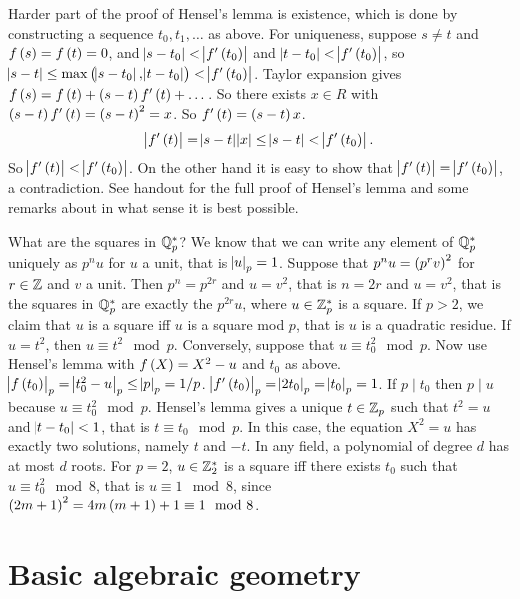 Harder part of the proof of Hensel's lemma is existence, which is done by constructing a sequence $ t_0, t_1, \dots $ as above. For uniqueness, suppose $ s \ne t $ and $ f\br{s} = f\br{t} = 0 $, and $ \abs{s - t_0} < \abs{f'\br{t_0}} $ and $ \abs{t - t_0} < \abs{f'\br{t_0}} $, so $ \abs{s - t} \le \max\br{\abs{s - t_0}, \abs{t - t_0}} < \abs{f'\br{t_0}} $. Taylor expansion gives $ f\br{s} = f\br{t} + \br{s - t}f'\br{t} + \dots $. So there exists $ x \in R $ with $ \br{s - t}f'\br{t} = \br{s - t}^2 = x $. So $ f'\br{t} = \br{s - t}x $.
$$ \abs{f'\br{t}} = \abs{s - t}\abs{x} \le \abs{s - t} < \abs{f'\br{t_0}}. $$
So $ \abs{f'\br{t}} < \abs{f'\br{t_0}} $. On the other hand it is easy to show that $ \abs{f'\br{t}} = \abs{f'\br{t_0}} $, a contradiction. See handout for the full proof of Hensel's lemma and some remarks about in what sense it is best possible.


What are the squares in $ \mathbb{Q}_p^* $? We know that we can write any element of $ \mathbb{Q}_p^* $ uniquely as $ p^nu $ for $ u $ a unit, that is $ \abs{u}_p = 1 $. Suppose that $ p^nu = \br{p^rv}^2 $ for $ r \in \mathbb{Z} $ and $ v $ a unit. Then $ p^n = p^{2r} $ and $ u = v^2 $, that is $ n = 2r $ and $ u = v^2 $, that is the squares in $ \mathbb{Q}_p^* $ are exactly the $ p^{2r}u $, where $ u \in \mathbb{Z}_p^* $ is a square. If $ p > 2 $, we claim that $ u $ is a square iff $ u $ is a square mod $ p $, that is $ u $ is a quadratic residue. If $ u = t^2 $, then $ u \equiv t^2 \mod p $. Conversely, suppose that $ u \equiv t_0^2 \mod p $. Now use Hensel's lemma with $ f\br{X} = X^2 - u $ and $ t_0 $ as above. $ \abs{f\br{t_0}}_p = \abs{t_0^2 - u}_p \le \abs{p}_p = 1 / p $. $ \abs{f'\br{t_0}}_p = \abs{2t_0}_p = \abs{t_0}_p = 1 $. If $ p \mid t_0 $ then $ p \mid u $ because $ u \equiv t_0^2 \mod p $. Hensel's lemma gives a unique $ t \in \mathbb{Z}_p $ such that $ t^2 = u $ and $ \abs{t - t_0} < 1 $, that is $ t \equiv t_0 \mod p $. In this case, the equation $ X^2 = u $ has exactly two solutions, namely $ t $ and $ -t $. In any field, a polynomial of degree $ d $ has at most $ d $ roots. For $ p = 2 $, $ u \in \mathbb{Z}_2^* $ is a square iff there exists $ t_0 $ such that $ u \equiv t_0^2 \mod 8 $, that is $ u \equiv 1 \mod 8 $, since $ \br{2m + 1}^2 = 4m\br{m + 1} + 1 \equiv 1 \mod 8 $.

\pagebreak

\section{Basic algebraic geometry}

